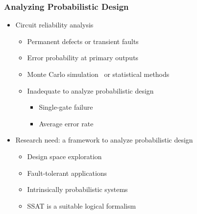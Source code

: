 \begin{frame}
      \frametitle{Analyzing Probabilistic Design}
      \begin{itemize}
            \item Circuit reliability analysis
                  \begin{itemize}
                        \item Permanent defects or transient faults
                        \item Error probability at primary outputs
                        \item Monte Carlo simulation~\cite{Mohanram2003} or statistical methods~\cite{Bahar2003,Krishnaswamy2005,Rejimon2005}
                        \item Inadequate to analyze probabilistic design
                              \begin{itemize}
                                    \item Single-gate failure
                                    \item Average error rate
                              \end{itemize}
                  \end{itemize}
                  \pause
            \item \alert{Research need: a framework to analyze probabilistic design}
                  \begin{itemize}
                        \item Design space exploration
                        \item Fault-tolerant applications
                        \item Intrinsically probabilistic systems
                        \item SSAT is a suitable logical formalism
                  \end{itemize}
      \end{itemize}
\end{frame}

